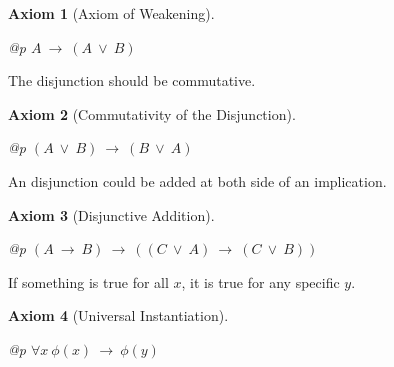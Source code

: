 \documentclass[a4paper,german,10pt,twoside]{book}
\newtheorem{ax}{Axiom}
\theoremstyle{definition}
\theoremstyle{remark}
\begin{document}
\begin{ax}[Axiom of Weakening]
\label{axiom:disjunction_weakening} \hypertarget{axiom:disjunction_weakening}{}
\mbox{}
\begin{longtable}{{@{\extracolsep{\fill}}p{\linewidth}}}
\centering $A\ \rightarrow \ (A\ \lor \ B)$
\end{longtable}

\end{ax}




\par
The disjunction should be commutative.

\begin{ax}[Commutativity of the Disjunction]
\label{axiom:disjunction_commutative} \hypertarget{axiom:disjunction_commutative}{}
\mbox{}
\begin{longtable}{{@{\extracolsep{\fill}}p{\linewidth}}}
\centering $(A\ \lor \ B)\ \rightarrow \ (B\ \lor \ A)$
\end{longtable}

\end{ax}




\par
An disjunction could be added at both side of an implication.

\begin{ax}[Disjunctive Addition]
\label{axiom:disjunction_addition} \hypertarget{axiom:disjunction_addition}{}
\mbox{}
\begin{longtable}{{@{\extracolsep{\fill}}p{\linewidth}}}
\centering $(A\ \rightarrow \ B)\ \rightarrow \ ((C\ \lor \ A)\ \rightarrow \ (C\ \lor \ B))$
\end{longtable}

\end{ax}




\par
If something is true for all $x$, it is true for any specific $y$.

\begin{ax}[Universal Instantiation]
\label{axiom:universalInstantiation} \hypertarget{axiom:universalInstantiation}{}
\mbox{}
\begin{longtable}{{@{\extracolsep{\fill}}p{\linewidth}}}
\centering $\forall x\ \phi(x)\ \rightarrow \ \phi(y)$
\end{longtable}

\end{ax}
\end{document}
